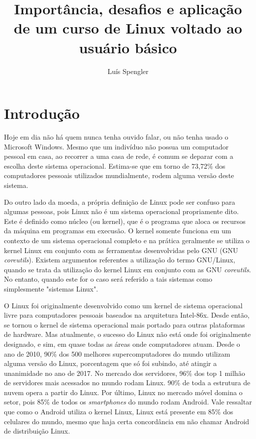 \documentclass{article}
\title{Importância, desafios e aplicação de um curso de Linux voltado ao usuário básico}
\date{}
\author[1]{Luís Spengler}
\affil[1]{Instituto Federal de Educação, Ciência e Tecnologia de Mato Grosso do Sul}
\begin{document}
\maketitle

\tableofcontents

\medskip

\section{Introdução}
Hoje em dia não há quem nunca tenha ouvido falar, ou não tenha usado o Microsoft Windows. Mesmo que um indivíduo não possua um computador pessoal em casa, ao recorrer a uma casa de rede, é comum se deparar com a escolha deste sistema operacional. Estima-se que em torno de 73,72\% dos computadores pessoais utilizados mundialmente, rodem alguma versão deste sistema. \cite{statista1}

Do outro lado da moeda, a própria definição de Linux pode ser confuso para algumas pessoas, pois Linux não é um sistema operacional propriamente dito. Este é definido como núcleo (ou kernel), que é o programa que aloca os recursos da máquina em programas em execusão. O kernel somente funciona em um contexto de um sistema operacional completo e na prática geralmente se utiliza o kernel Linux em conjunto com as ferramentas desenvolvidas pelo GNU (GNU \textit{coreutils}). Existem argumentos referentes a utilização do termo GNU/Linux, quando se trata da utilização do kernel Linux em conjunto com as GNU \textit{coreutils}. \cite{GNU} No entanto, quando este for o caso será referido a tais sistemas como simplesmente "sistemas Linux".

O Linux foi originalmente desenvolvido como um kernel de sistema operacional livre para computadores pessoais baseados na arquitetura Intel-86x. Desde então, se tornou o kernel de sistema operacional mais portado para outras plataformas de hardware. \cite{garrels} Mas atualmente, o sucesso do Linux não está onde foi originalmente designado, e sim, em quase todas as áreas onde computadores atuam. Desde o ano de 2010, 90\% dos 500 melhores supercomputadores do mundo utilizam alguma versão do Linux, porcentagem que só foi subindo, até atingir a unanimidade no ano de 2017. \cite{top500}  No mercado dos servidores, 96\% dos top 1 milhão de servidores mais acessados no mundo rodam Linux. 90\% de toda a estrutura de nuvem opera a partir do Linux. Por último, Linux no mercado móvel domina o setor, pois 85\% de todos os \textit{smartphones} do mundo rodam Android. \cite{LF} Vale ressaltar que como o Android utiliza o kernel Linux, Linux está presente em 85\% dos celulares do mundo, mesmo que haja certa concordância em não chamar Android de distribuição Linux. \cite{arstechnica}
\end{document}
